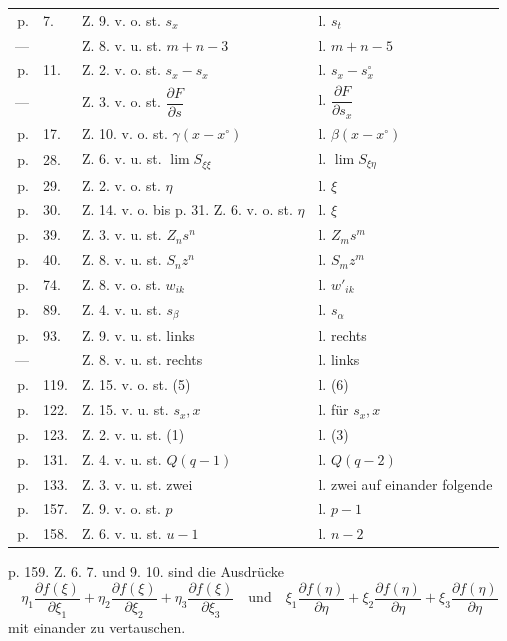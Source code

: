 \documentclass[10pt]{article}
\begin{document}
\begin{tabular}{@{}r@{\ }l@{\ }l@{\ }l@{}}
p. & 7. & Z. 9. v. o. st. $s_x$ & l. $s_t$\\
--- & & Z. 8. v. u. st. $m+n-3$ & l. $m+n-5$\\
p. & 11. & Z. 2. v. o. st. $s_x-s_x$ & l. $s_x-s_x^\circ$\\
--- & & Z. 3. v. o. st. $\dfrac{\partial F}{\partial s}$ & l. $\dfrac{\partial F}{\partial s_x}$\\
p. & 17. & Z. 10. v. o. st. $\gamma(x-x^\circ)$ & l. $\beta(x-x^\circ)$\\
p. & 28. & Z. 6. v. u. st. $\lim S_{\xi\xi}$ & l. $\lim S_{\xi\eta}$\\
p. & 29. & Z. 2. v. o. st. $\eta$ & l. $\xi$\\
p. & 30. & Z. 14. v. o. bis p. 31. Z. 6. v. o. st. $\eta$ & l. $\xi$\\
p. & 39. & Z. 3. v. u. st. $Z_ns^n$ & l. $Z_ms^m$\\
p. & 40. & Z. 8. v. u. st. $S_nz^n$ & l. $S_mz^m$\\
p. & 74. & Z. 8. v. o. st. $w_{ik}$ & l. $w'_{ik}$\\
p. & 89. & Z. 4. v. u. st. $s_\beta$ & l. $s_\alpha$\\
p. & 93. & Z. 9. v. u. st. links & l. rechts\\
--- & & Z. 8. v. u. st. rechts & l. links\\
p. & 119. & Z. 15. v. o. st. (5) & l. (6)\\
p. & 122. & Z. 15. v. u. st. $s_x, x$ & l. für $s_x, x$\\
p. & 123. & Z. 2. v. u. st. (1) & l. (3)\\
p. & 131. & Z. 4. v. u. st. $Q(q-1)$ & l. $Q(q-2)$\\
p. & 133. & Z. 3. v. u. st. zwei & l. zwei auf einander folgende\\
p. & 157. & Z. 9. v. o. st. $p$ & l. $p-1$\\
p. & 158. & Z. 6. v. u. st. $u-1$ & l. $n-2$\\
\end{tabular}

\vspace{0.7em}
\noindent p. 159. Z. 6. 7. und 9. 10. sind die Ausdrücke
\[
\eta_1\frac{\partial f(\xi)}{\partial \xi_1}
+\eta_2\frac{\partial f(\xi)}{\partial \xi_2}
+\eta_3\frac{\partial f(\xi)}{\partial \xi_3}
\quad\text{und}\quad
\xi_1\frac{\partial f(\eta)}{\partial \eta}
+\xi_2\frac{\partial f(\eta)}{\partial \eta}
+\xi_3\frac{\partial f(\eta)}{\partial \eta}
\]
mit einander zu vertauschen.
\end{document}
